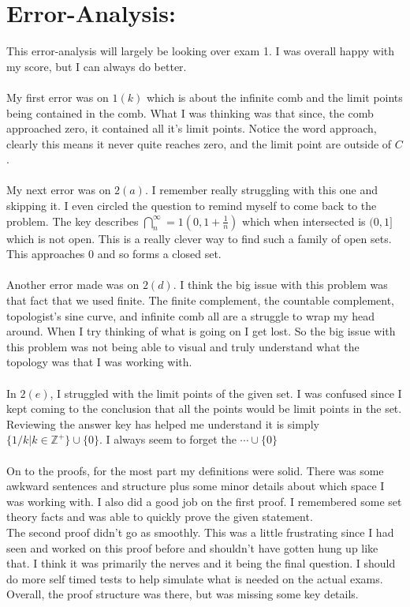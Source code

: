 \documentclass[10pt]{article}
\begin{document}
\section*{Error-Analysis:}
This error-analysis will largely be looking over exam 1. I was overall happy with my score, but I can always do better.\\
\\
My first error was on $ 1(k) $ which is about the infinite comb and the limit points being contained in the comb. What I was thinking was that since, the comb approached zero, it contained all it's limit points. Notice the word approach, clearly this means it never quite reaches zero, and the limit point are outside of $ C $.\\
\\
My next error was on $ 2(a) $. I remember really struggling with this one and skipping it. I even circled the question to remind myself to come back to the problem. The key describes $ \bigcap^\infty_n=1 (0,1+\frac{1}{n}) $ which when intersected is $ (0,1] $ which is not open. This is a really clever way to find such a family of open sets. This approaches 0 and so forms a closed set.\\
\\
Another error made was on $ 2(d) $. I think the big issue with this problem was that fact that we used finite. The finite complement, the countable complement, topologist's sine curve, and infinite comb all are a struggle to wrap my head around. When I try thinking of what is going on I get lost. So the big issue with this problem was not being able to visual and truly understand what the topology was that I was working with.\\
\\
In $ 2(e) $, I struggled with the limit points of the given set. I was confused since I kept coming to the conclusion that all the points would be limit points in the set. Reviewing the answer key has helped me understand it is simply $\{1/k|k\in\mathbb{Z}^+\}\cup\{0\} $. I always seem to forget the $ \cdots\cup\{0\} $\\
\\
On to the proofs, for the most part my definitions were solid. There was some awkward sentences and structure plus some minor details about which space I was working with. I also did a good job on the first proof. I remembered some set theory facts and was able to quickly prove the given statement. \\
The second proof didn't go as smoothly. This was a little frustrating since I had seen and worked on this proof before and shouldn't have gotten hung up like that. I think it was primarily the nerves and it being the final question. I should do more self timed tests to help simulate what is needed on the actual exams. Overall, the proof structure was there, but was missing some key details.
\end{document}
